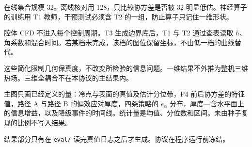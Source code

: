 在线集合规模 32。离线核对用 128，只比较协方差是否被 32 明显低估。神经算子的训练用 T1 教师，干预测试必须含 T2 的一组，防止算子只记住一维形状。

腔体 CFD 不进入每个控制周期。T3 生成边界库后，T1 与 T2 通过查表读取 $h$、角系数和混合时间。若某档未完成，该档的图位保留坐标，不由低一档的曲线替代。

这些简化限制几何保真度，不改变所检验的信息问题。一维结果不外推为整机三维热场。三维全耦合不在本协议的主结果内。

主图只画已经定义的量：冷点与表面的真值及估计分位带，P4 前后协方差的特征值，路径 A 与路径 B 的偏效应对厚度，四条策略的 $e_{\alpha}$ 分布，厚度—含水平面上的信息增益，以及降级事件的时间线。统计量是均值、分位数和区间。未由种子复现的比例不写入结果。

结果部分只有在 \texttt{eval/} 读完真值日志之后才生成。协议在程序运行前冻结。
